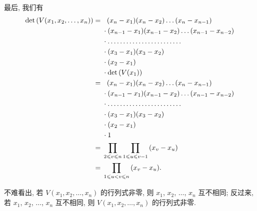 \begin{example}
    最后, 我们有
    \begin{align*}
        \det {(V(x_1, x_2, \dots, x_n))}
        = {} & \hphantom{\cdot\,\,}
        (x_n - x_1) (x_n - x_2) \dots (x_n - x_{n-1})
        \\
             & \cdot
        (x_{n-1} - x_1) (x_{n-1} - x_2) \dots (x_{n-1} - x_{n-2})
        \\
             & \cdot
        \dots \dots \dots \dots
        \dots \dots \dots \dots
        \\
             & \cdot
        (x_3 - x_1) (x_3 - x_2)
        \\
             & \cdot
        (x_2 - x_1)
        \\
             & \cdot
        \det {(V(x_1))}
        \\
        = {} & \hphantom{\cdot\,\,}
        (x_n - x_1) (x_n - x_2) \dots (x_n - x_{n-1})
        \\
             & \cdot
        (x_{n-1} - x_1) (x_{n-1} - x_2) \dots (x_{n-1} - x_{n-2})
        \\
             & \cdot
        \dots \dots \dots \dots
        \dots \dots \dots \dots
        \\
             & \cdot
        (x_3 - x_1) (x_3 - x_2)
        \\
             & \cdot
        (x_2 - x_1)
        \\
             & \cdot
        1
        \\
        = {} &
        \prod_{2 \leq v \leq n}
        {
            \prod_{1 \leq u \leq v-1} {(x_v - x_u)}
        }
        \\
        = {} &
        \prod_{1 \leq u < v \leq n} {(x_v - x_u)}.
    \end{align*}

    不难看出,
    若 \(V(x_1, x_2, \dots, x_n)\) 的行列式非零,
    则 \(x_1\), \(x_2\), \(\dots\), \(x_n\) 互不相同;
    反过来,
    若 \(x_1\), \(x_2\), \(\dots\), \(x_n\) 互不相同,
    则 \(V(x_1, x_2, \dots, x_n)\) 的行列式非零.
\end{example}

